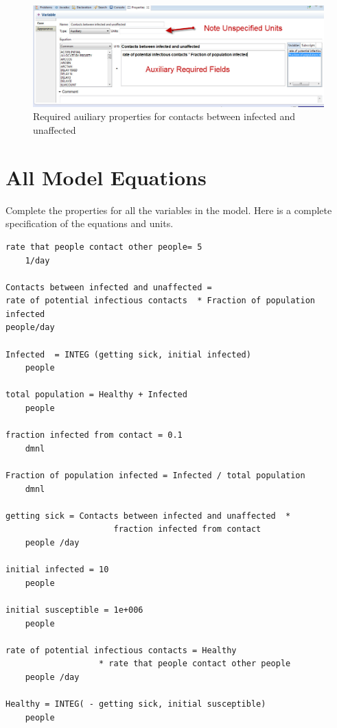 \documentclass[11pt]{amsart}
\begin{document}
\begin{figure}[ht]
\begin{center}
\vspace{.2in}
\centerline {
\includegraphics[totalheight=0.3\textheight]{images/020.jpg}
}
\caption{Required auiliary properties for contacts between infected and unaffected}
\label{fig:020}
\end{center}
\end{figure}

\section{All Model Equations}
Complete the properties for all the variables in the model. Here is a complete specification of the equations and units.

\begin{verbatim}
rate that people contact other people= 5
	1/day
	
Contacts between infected and unaffected = 
rate of potential infectious contacts  * Fraction of population infected
people/day

Infected  = INTEG (getting sick, initial infected)
	people

total population = Healthy + Infected
	people

fraction infected from contact = 0.1
	dmnl

Fraction of population infected = Infected / total population
	dmnl

getting sick = Contacts between infected and unaffected  * 
                      fraction infected from contact
	people /day

initial infected = 10
	people

initial susceptible = 1e+006
	people	

rate of potential infectious contacts = Healthy  
                   * rate that people contact other people
	people /day

Healthy = INTEG( - getting sick, initial susceptible)
	people
\end{verbatim}
 
\clearpage
\end{document}
